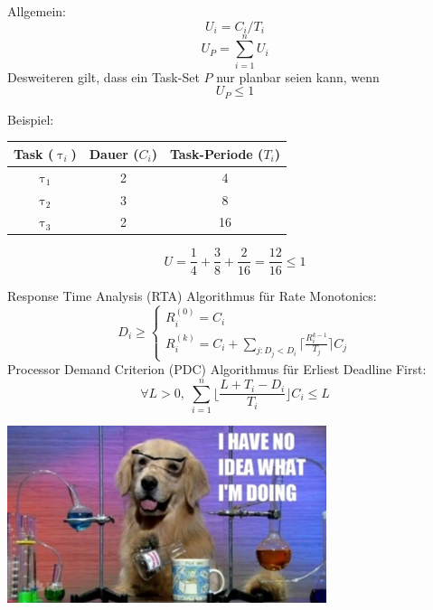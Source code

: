 \begin{frame}{\subsecname}
	Allgemein:
	\begin{equation}
		U_i = C_i / T_i
	\end{equation}
	\begin{equation}
		U_P = \sum_{i=1}^n U_i
	\end{equation}
	Desweiteren gilt, dass ein Task-Set $P$ nur planbar seien kann, wenn
	\begin{equation}
		U_P \leq 1
	\end{equation}
\end{frame}

\begin{frame}{\subsecname}
	Beispiel:
	\begin{tabular}{c||c|c}
		Task ($\uptau_i$) & Dauer ($C_i$) & Task-Periode ($T_i$)\\\hline\hline
		$\uptau_1$ & 2 & 4\\
		$\uptau_2$ & 3 & 8\\
		$\uptau_3$ & 2 & 16
	\end{tabular}
	\begin{equation}
		U = \frac{1}{4} + \frac{3}{8} + \frac{2}{16} = \frac{12}{16} \leq 1
	\end{equation}
\end{frame}

\begin{frame}{\subsecname}
	Response Time Analysis (RTA) Algorithmus für Rate Monotonics:
	\begin{equation}
		D_i \geq
		\begin{cases}
   				R_i^{(0)}=C_i \\
   				R_i^{(k)}=C_i+ \sum_{j:D_j<D_i} \lceil \frac{R_i^{k-1}}{T_j}\rceil C_j
  		\end{cases}
	\end{equation}
	Processor Demand Criterion (PDC) Algorithmus für Erliest Deadline First:
	\begin{equation}
		\forall L > 0,\; \sum_{i=1}^n\lfloor \frac{L+T_i-D_i}{T_i}\rfloor C_i \leq L
	\end{equation}
\end{frame}

\begin{frame}
	\begin{center}
		\includegraphics[width=0.7\textwidth]{graphics/memes/sciencedog.jpg}
	\end{center}
\end{frame}

